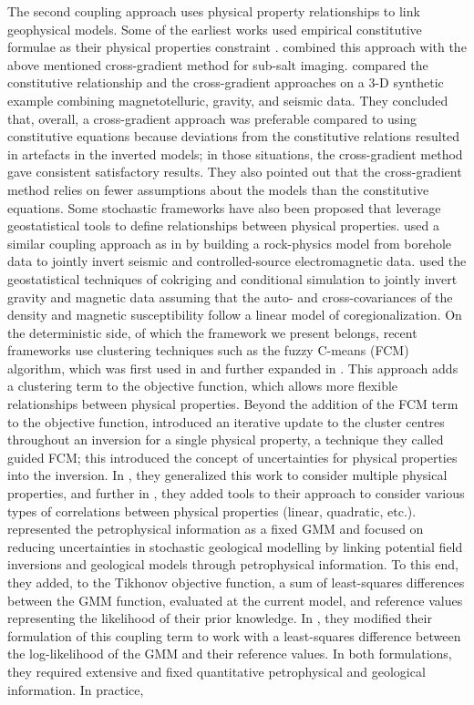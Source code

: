\documentclass[extra, mreferee]{gji_joint} %
\begin{document}
The second coupling approach uses physical property relationships to link geophysical models. Some of the earliest works used empirical constitutive formulae as their physical properties constraint \citep{Afnimar2002, Hoversten2006, Chen2007}. \citet{Stefano2011} combined this approach with the above mentioned cross-gradient method for sub-salt imaging. \citet{Moorkamp2011} compared the constitutive relationship and the cross-gradient approaches on a 3-D synthetic example combining magnetotelluric, gravity, and seismic data. They concluded that, overall, a cross-gradient approach was preferable compared to using constitutive equations because deviations from the constitutive relations resulted in artefacts in the inverted models; in those situations, the cross-gradient method gave consistent satisfactory results. They also pointed out that the cross-gradient method relies on fewer assumptions about the models than the constitutive equations. Some stochastic frameworks have also been proposed that leverage geostatistical tools to define relationships between physical properties. \citet{Chen2012} used a similar coupling approach as in \citet{Bosch2004} \citep{doi:10.1002/9781118929063.ch9} by building a rock-physics model from borehole data to jointly invert seismic and controlled-source electromagnetic data. \citet{Shamsipour2012} used the geostatistical techniques of cokriging and conditional simulation to jointly invert gravity and magnetic data assuming that the auto- and cross-covariances of the density and magnetic susceptibility follow a linear model of coregionalization. On the deterministic side, of which the framework we present belongs, recent frameworks use clustering techniques such as the fuzzy C-means (FCM) algorithm, which was first used in \citet{Paasche2007} and further expanded in \citet{Lelievre2012}. This approach adds a clustering term to the objective function, which allows more flexible relationships between physical properties. Beyond the addition of the FCM term to the objective function, \citet{Sun2015} introduced an iterative update to the cluster centres throughout an inversion for a single physical property, a technique they called guided FCM; this introduced the concept of uncertainties for physical properties into the inversion. In \citet{Sun2016}, they generalized this work to consider multiple physical properties, and further in \citet{Sun2017}, they added tools to their approach to consider various types of correlations between physical properties (linear, quadratic, etc.). \citet{Giraud2017} represented the petrophysical information as a fixed GMM and focused on reducing uncertainties in stochastic geological modelling by linking potential field inversions and geological models through petrophysical information. To this end, they added, to the Tikhonov objective function, a sum of least-squares differences between the GMM function, evaluated at the current model, and reference values representing the likelihood of their prior knowledge. In \citet{Giraud2019}, they modified their formulation of this coupling term to work with a least-squares difference between the log-likelihood of the GMM and their reference values. In both formulations, they required extensive and fixed quantitative petrophysical and geological information. In practice, 
\end{document}
